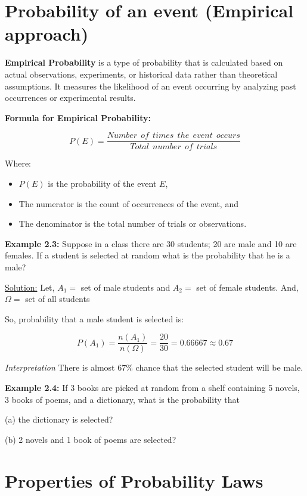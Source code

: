 \documentclass[
  11pt,
  letterpaper,
  DIV=11,
  numbers=noendperiod]{scrreprt}
\begin{document}
\section{Probability of an event (Empirical
approach)}\label{probability-of-an-event-empirical-approach}

\textbf{Empirical Probability} is a type of probability that is
calculated based on actual observations, experiments, or historical data
rather than theoretical assumptions. It measures the likelihood of an
event occurring by analyzing past occurrences or experimental results.

\textbf{Formula for Empirical Probability:}

\[ P(E)=\frac{Number\ \ of  \ \ times \ \ the\ \  event\ \  occurs}{Total \ \ number\ \  of \ \ trials} \]

Where:

\begin{itemize}
\item
  \(P(E)\) is the probability of the event \(E\),
\item
  The numerator is the count of occurrences of the event, and
\item
  The denominator is the total number of trials or observations.
\end{itemize}

\textbf{Example 2.3:} Suppose in a class there are 30 students; 20 are
male and 10 are females. If a student is selected at random what is the
probability that he is a male?

\ul{Solution:} Let, \(A_1=\) set of male students and \(A_2=\) set of
female students. And, \(\Omega=\) set of all students

So, probability that a male student is selected is:

\[P(A_1)=\frac{n(A_1)}{n(\Omega)}=\frac{20}{30}=0.66667\approx 0.67\]

\emph{Interpretation} There is almost \(67\%\) chance that the selected
student will be male.

\textbf{Example 2.4:} If 3 books are picked at random from a shelf
containing 5 novels, 3 books of poems, and a dictionary, what is the
probability that

(a) the dictionary is selected?

(b) 2 novels and 1 book of poems are selected?

\section{Properties of Probability
Laws}\label{properties-of-probability-laws}
\end{document}
